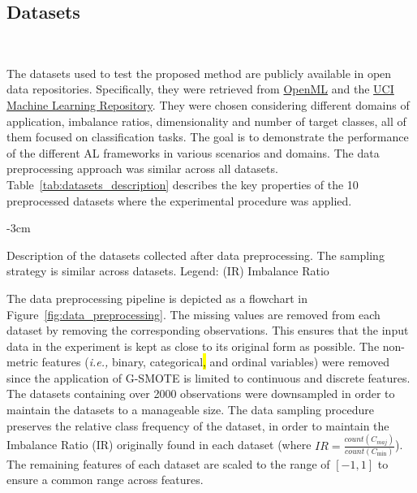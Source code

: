 \documentclass[preprint, 12pt]{elsarticle}
\begin{document}
\subsection{Datasets}~\label{sec:datasets}

The datasets used to test the proposed method are publicly available in open
data repositories. Specifically, they were retrieved from
\href{https://www.openml.org/}{OpenML} and the
\href{https://archive.ics.uci.edu/}{UCI Machine Learning Repository}. They
were chosen considering different domains of application, imbalance ratios,
dimensionality and number of target classes, all of them focused on
classification tasks. The goal is to demonstrate the performance of the
different AL frameworks in various scenarios and domains. The data
preprocessing approach was similar across all datasets.
Table~\ref{tab:datasets_description} describes the key properties of the 10
preprocessed datasets where the experimental procedure was applied. 
 
\begin{table}[H]
    \centering
    \addtolength{\leftskip} {-3cm}
    \addtolength{\rightskip}{-3cm}
    \caption{\label{tab:datasets_description}
        Description of the datasets collected after data preprocessing. The
        sampling strategy is similar across datasets. Legend: (IR) Imbalance
        Ratio
    }
\end{table}

The data preprocessing pipeline is depicted as a flowchart in
Figure~\ref{fig:data_preprocessing}. The missing values are removed from each
dataset by removing the corresponding observations. This ensures that the
input data in the experiment is kept as close to its original form as
possible. The non-metric features (\textit{i.e.,} binary, categorical\hl{,}
and ordinal variables) were removed since the application of G-SMOTE is
limited to continuous and discrete features. The datasets containing over 2000
observations were downsampled in order to maintain the datasets to a
manageable size. The data sampling procedure preserves the relative class
frequency of the dataset, in order to maintain the Imbalance Ratio (IR)
originally found in each dataset (where $IR =
\frac{count(C_{maj})}{count(C_{\min})}$). The remaining features of each
dataset are scaled to the range of $[-1, 1]$ to ensure a common range across
features.
\end{document}
